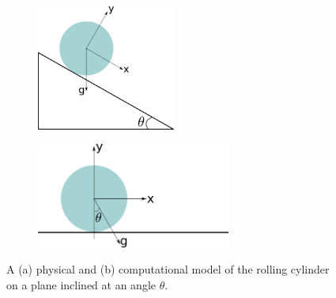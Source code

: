 \begin{figure}[!htpb]
  \centering
  \begin{subfigure}{0.48\textwidth}
    \centering
    \includegraphics[width=0.5\textwidth]{images/rfc/images/de_2021_cylinder_rolling_on_an_inclined_plane/schematic_1}
    \subcaption{}\label{fig:circular-body:schematic-1}
  \end{subfigure}
  \begin{subfigure}{0.48\textwidth}
    \centering
    \includegraphics[width=0.7\textwidth]{images/rfc/images/de_2021_cylinder_rolling_on_an_inclined_plane/schematic_2}
    \subcaption{}\label{fig:circular-body:schematic-2}
  \end{subfigure}
  \caption{A (a) physical and (b) computational model of the rolling cylinder on a
    plane inclined at an angle $\theta$.}
\label{fig:circular-body-schematic}
\end{figure}
